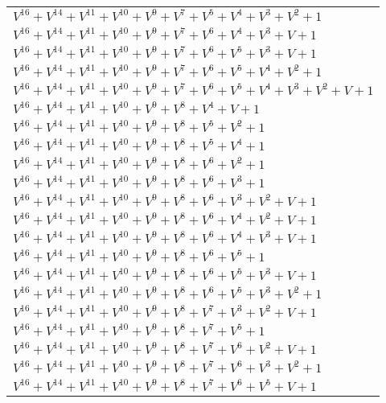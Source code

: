 \documentclass[12pt]{article}
\begin{document}
\begin{adjustwidth}{-4cm}{}
\begin{center}
\begin{longtable}{|l|}
$V^{16}  +V^{14}  +V^{11}  +V^{10}  +V^{9}  +V^{7}  +V^{5}  +V^{4}  +V^{3}  +V^{2}  + 1$ \\
$V^{16}  +V^{14}  +V^{11}  +V^{10}  +V^{9}  +V^{7}  +V^{6}  +V^{4}  +V^{3}  + V + 1$ \\
$V^{16}  +V^{14}  +V^{11}  +V^{10}  +V^{9}  +V^{7}  +V^{6}  +V^{5}  +V^{3}  + V + 1$ \\
$V^{16}  +V^{14}  +V^{11}  +V^{10}  +V^{9}  +V^{7}  +V^{6}  +V^{5}  +V^{4}  +V^{2}  + 1$ \\
$V^{16}  +V^{14}  +V^{11}  +V^{10}  +V^{9}  +V^{7}  +V^{6}  +V^{5}  +V^{4}  +V^{3}  +V^{2}  + V + 1$ \\
$V^{16}  +V^{14}  +V^{11}  +V^{10}  +V^{9}  +V^{8}  +V^{4}  + V + 1$ \\
$V^{16}  +V^{14}  +V^{11}  +V^{10}  +V^{9}  +V^{8}  +V^{5}  +V^{2}  + 1$ \\
$V^{16}  +V^{14}  +V^{11}  +V^{10}  +V^{9}  +V^{8}  +V^{5}  +V^{4}  + 1$ \\
$V^{16}  +V^{14}  +V^{11}  +V^{10}  +V^{9}  +V^{8}  +V^{6}  +V^{2}  + 1$ \\
$V^{16}  +V^{14}  +V^{11}  +V^{10}  +V^{9}  +V^{8}  +V^{6}  +V^{3}  + 1$ \\
$V^{16}  +V^{14}  +V^{11}  +V^{10}  +V^{9}  +V^{8}  +V^{6}  +V^{3}  +V^{2}  + V + 1$ \\
$V^{16}  +V^{14}  +V^{11}  +V^{10}  +V^{9}  +V^{8}  +V^{6}  +V^{4}  +V^{2}  + V + 1$ \\
$V^{16}  +V^{14}  +V^{11}  +V^{10}  +V^{9}  +V^{8}  +V^{6}  +V^{4}  +V^{3}  + V + 1$ \\
$V^{16}  +V^{14}  +V^{11}  +V^{10}  +V^{9}  +V^{8}  +V^{6}  +V^{5}  + 1$ \\
$V^{16}  +V^{14}  +V^{11}  +V^{10}  +V^{9}  +V^{8}  +V^{6}  +V^{5}  +V^{3}  + V + 1$ \\
$V^{16}  +V^{14}  +V^{11}  +V^{10}  +V^{9}  +V^{8}  +V^{6}  +V^{5}  +V^{3}  +V^{2}  + 1$ \\
$V^{16}  +V^{14}  +V^{11}  +V^{10}  +V^{9}  +V^{8}  +V^{7}  +V^{3}  +V^{2}  + V + 1$ \\
$V^{16}  +V^{14}  +V^{11}  +V^{10}  +V^{9}  +V^{8}  +V^{7}  +V^{5}  + 1$ \\
$V^{16}  +V^{14}  +V^{11}  +V^{10}  +V^{9}  +V^{8}  +V^{7}  +V^{6}  +V^{2}  + V + 1$ \\
$V^{16}  +V^{14}  +V^{11}  +V^{10}  +V^{9}  +V^{8}  +V^{7}  +V^{6}  +V^{3}  +V^{2}  + 1$ \\
$V^{16}  +V^{14}  +V^{11}  +V^{10}  +V^{9}  +V^{8}  +V^{7}  +V^{6}  +V^{5}  + V + 1$ \\

\end{longtable}
\end{center}
\end{adjustwidth}
\end{document}
